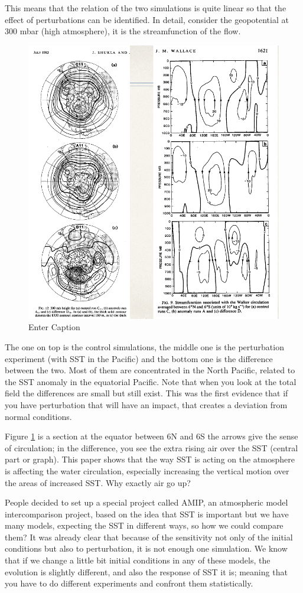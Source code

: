 This means that the relation of the two simulations is quite linear so that the effect of perturbations can be identified. In detail, consider the geopotential at 300 mbar (high atmosphere), it is the streamfunction of the flow. 
\begin{figure}[h!]
    \centering
    \includegraphics[width=0.5\linewidth]{uploads/Screenshot 2024-11-20 212453.png}
    \caption{Enter Caption}
    \label{fig:figure 1.7}
\end{figure}
The one on top is the control simulations, the middle one is the perturbation experiment (with SST in the Pacific) and the bottom one is the difference between the two. 
Most of them are concentrated in the North Pacific, related to the SST anomaly in the equatorial Pacific. Note that when you look at the total field the differences are small but still exist.
This was the first evidence that if you have perturbation that will have an impact, that creates a deviation from normal conditions.  

Figure \ref{fig:figure 1.7} is a section at the equator between 6N and 6S 
the arrows give the sense of circulation; in the difference, you see the extra rising air over the SST (central part or graph). This paper shows that the way SST is acting on the atmosphere is affecting the water circulation, especially increasing the vertical motion over the areas of increased SST. Why exactly air go up?

People decided to set up a special project called AMIP, an atmospheric model intercomparison project, based on the idea that SST is important but we have many models, expecting the SST in different ways, so how we could compare them? 
It was already clear that because of the sensitivity not only of the initial conditions but also to perturbation, it is not enough one simulation. 
We know that if we change a little bit initial conditions in any of these models, the evolution is slightly different, and also the response of SST it is; meaning that you have to do different experiments and confront them statistically. 

